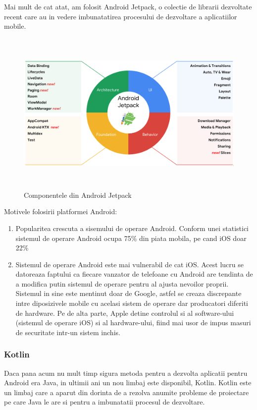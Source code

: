 \documentclass[12pt]{article}
\begin{document}
Mai mult de cat atat, am folosit Android Jetpack,
o colectie de librarii dezvoltate recent care au in vedere imbunatatirea procesului de dezvoltare
a aplicatiilor mobile. 

\begin{figure}[H]
\centering
\includegraphics[width=12cm, height=8cm]{androidjetpack.png}
\caption{Componentele din Android Jetpack \cite{jetpackpng}}
\end{figure}

\bigskip
Motivele folosirii platformei Android:
\begin{enumerate}
    \item Popularitea crescuta a sisemului de operare Android. Conform unei 
    statistici \cite{statcounter} sistemul de operare Android ocupa 75\% din 
    piata mobila, pe cand iOS doar 22\%
    \item Sistemul de operare Android este mai vulnerabil de cat iOS. Acest
    lucru se datoreaza faptului ca fiecare vanzator de telefoane cu Android
    are tendinta de a modifica putin sistemul de operare pentru al ajusta nevoilor
    proprii. Sistemul in sine este mentinut doar de Google, astfel se creaza discrepante
    intre diposizivele mobile cu acelasi sistem de operare dar producatori diferiti
    de hardware. Pe de alta parte, Apple detine controlul si al software-ului (sistemul de operare iOS) 
    si al hardware-ului, fiind mai usor de impus masuri de securitate intr-un sistem inchis.
\end{enumerate}

\subsubsection{Kotlin}

Daca pana acum nu mult timp sigura metoda pentru a dezvolta aplicatii pentru Android era Java, in ultimii
ani un nou limbaj este disponibil, Kotlin. Kotlin este un limbaj care a aparut din dorinta de a rezolva
anumite probleme de proiectare pe care Java le are si pentru a imbunatatii procesul de dezvoltare.
\end{document}
